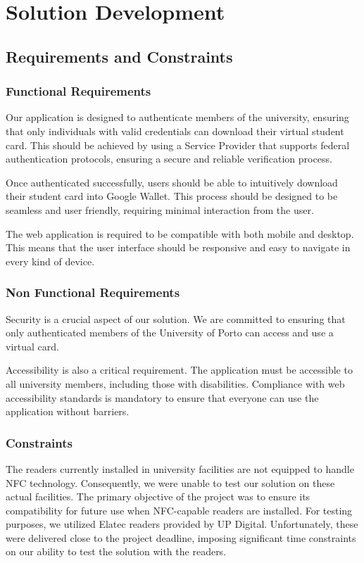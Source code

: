 \documentclass[12pt]{article}
\begin{document}
\section{Solution Development}

\subsection{Requirements and Constraints}

\subsubsection{Functional Requirements}

Our application is designed to authenticate members of the university, ensuring that only individuals with valid credentials can download their virtual student card. This should be achieved by using a Service Provider that supports federal authentication protocols, ensuring a secure and reliable verification process.

Once authenticated successfully, users should be able to intuitively download their student card into Google Wallet\cite{google-wallet}. This process should be designed to be seamless and user friendly, requiring minimal interaction from the user.

The web application is required to be compatible with both mobile and desktop. This means that the user interface should be responsive and easy to navigate in every kind of device.

\subsubsection{Non Functional Requirements}

Security is a crucial aspect of our solution. We are committed to ensuring that only authenticated members of the University of Porto can access and use a virtual card.

Accessibility is also a critical requirement. The application must be accessible to all university members, including those with disabilities. Compliance with web accessibility standards is mandatory to ensure that everyone can use the application without barriers.

\subsubsection{Constraints}\label{Constraints}

The readers currently installed in university facilities are not equipped to handle NFC technology. Consequently, we were unable to test our solution on these actual facilities. The primary objective of the project was to ensure its compatibility for future use when NFC-capable readers are installed. For testing purposes, we utilized Elatec\cite{elatec} readers provided by UP Digital. Unfortunately, these were delivered close to the project deadline, imposing significant time constraints on our ability to test the solution with the readers.
\end{document}
